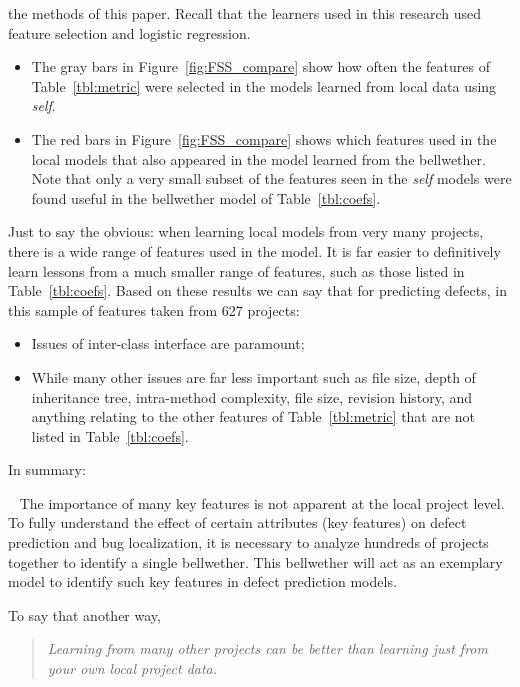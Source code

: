 \documentclass[10pt,journal,compsoc]{IEEEtran}
\newcommand{\fig}[1]{Figure~\ref{fig:#1}}
\newcommand{\bi}{\begin{itemize}}
\newcommand{\ei}{\end{itemize}}
\newenvironment{RQ}[1]%
{\noindent\begin{minipage}[c]{\linewidth}%
\begin{bclogo}[couleur=gray!20,%
                arrondi=0.1,logo=\bctrombone,%
                ombre=true%
                ]{{\small  ~#1}}}%
{\end{bclogo}\vspace{2mm}\end{minipage}}
\newcommand{\respto}[1]{
\fcolorbox{black}{black!15}{%
\label{resp:#1}%
\bf\scriptsize R{#1}}}
\begin{document}
the methods of this paper. Recall that the learners used in this research used feature selection and  logistic regression.
\begin{itemize}
\item  The gray bars in \fig{FSS_compare} show how often the features
of Table~\ref{tbl:metric} were selected in the models learned from
local data using {\em self}. 
\item
The red bars in \fig{FSS_compare} shows which features
used in the local models that also appeared in the model learned from the bellwether. 
  Note that only a very
small subset of the features seen in the  {\em self} models
were found useful in the bellwether model of Table~\ref{tbl:coefs}.
\end{itemize}
Just to say the obvious:
when learning
local models from very many projects, there is a wide range 
of features used in the model.
It is far easier to 
definitively learn lessons from a much smaller range
of features, such as those listed in Table~\ref{tbl:coefs}.
Based on these results
we can say that for predicting defects, in this sample of  features taken from 627 projects:
\bi
\item Issues of inter-class interface are paramount;
\item While many other  issues are far less important such as file size, depth of inheritance tree, intra-method complexity, file size, revision history, and anything relating to  the other features of Table~\ref{tbl:metric}
that are not listed in Table~\ref{tbl:coefs}.
\ei
In summary:

\begin{RQ}
{\respto{2-9}\respto{3-13} {\color{blue}The importance of many key features is not apparent at the local
project level. To fully understand the effect of certain attributes (key features) on defect prediction and bug localization, it is necessary to analyze hundreds of projects together to identify a single bellwether. This bellwether will act as an exemplary model to identify such key features in defect prediction models.}}  

\end{RQ}
To say that another way, 
\begin{quote}
{\em 
Learning from many other projects can be better than learning just from your own local project data.
}\end{quote}
\end{document}

